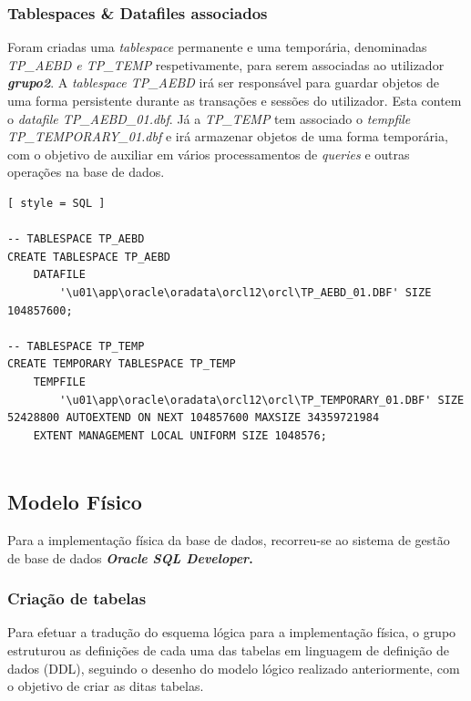 \documentclass[a4paper]{article}
\begin{document}
\subsubsection{Tablespaces \& Datafiles associados}
\hspace{3mm}

Foram criadas uma \emph{tablespace} permanente e uma temporária, denominadas \emph{TP\_AEBD e TP\_TEMP} respetivamente, para serem associadas ao utilizador \textbf{\emph{grupo2}}. A \emph{tablespace TP\_AEBD} irá ser responsável para guardar objetos de uma forma persistente durante as transações e sessões do utilizador. Esta contem o \emph{datafile TP\_AEBD\_01.dbf}. Já a \emph{TP\_TEMP} tem associado o \emph{tempfile TP\_TEMPORARY\_01.dbf} e irá armazenar objetos de uma forma temporária, com o objetivo de auxiliar em vários processamentos de \emph{queries} e outras operações na base de dados. 

\begin{lstlisting}[ style = SQL ]

-- TABLESPACE TP_AEBD
CREATE TABLESPACE TP_AEBD 
    DATAFILE 
        '\u01\app\oracle\oradata\orcl12\orcl\TP_AEBD_01.DBF' SIZE 104857600;

-- TABLESPACE TP_TEMP   
CREATE TEMPORARY TABLESPACE TP_TEMP 
    TEMPFILE 
        '\u01\app\oracle\oradata\orcl12\orcl\TP_TEMPORARY_01.DBF' SIZE 52428800 AUTOEXTEND ON NEXT 104857600 MAXSIZE 34359721984 
    EXTENT MANAGEMENT LOCAL UNIFORM SIZE 1048576;                    
                    
\end{lstlisting}

\subsection{Modelo Físico}
\hspace{3mm} 

Para a implementação física da base de dados, recorreu-se ao sistema de gestão de base de dados \textbf{\emph{Oracle SQL Developer}.} 

\subsubsection{Criação de tabelas}
\hspace{3mm}

Para efetuar a tradução do esquema lógica para a implementação física, o grupo estruturou as definições de cada uma das tabelas em linguagem de definição de dados (DDL), seguindo o desenho do modelo lógico realizado anteriormente, com o objetivo de criar as ditas tabelas.
\end{document}

